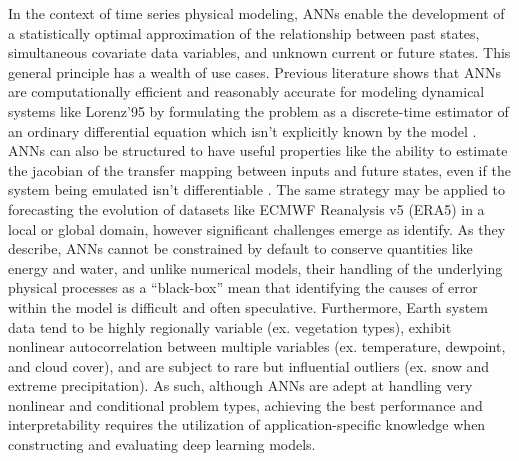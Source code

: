 In the context of time series physical modeling, ANNs enable the development of a statistically optimal approximation of the relationship between past states, simultaneous covariate data variables, and unknown current or future states. This general principle has a wealth of use cases. Previous literature shows that ANNs are computationally efficient and reasonably accurate for modeling dynamical systems like Lorenz'95 by formulating the problem as a discrete-time estimator of an ordinary differential equation which isn't explicitly known by the model \citep{fablet_bilinear_2018}. ANNs can also be structured to have useful properties like the ability to estimate the jacobian of the transfer mapping between inputs and future states, even if the system being emulated isn't differentiable \citep{nonnenmacher_deep_2021}. The same strategy may be applied to forecasting the evolution of datasets like ECMWF Reanalysis v5 (ERA5) in a local or global domain, however significant challenges emerge as \citep{dueben_challenges_2018} identify. As they describe, ANNs cannot be constrained by default to conserve quantities like energy and water, and unlike numerical models, their handling of the underlying physical processes as a ``black-box'' mean that identifying the causes of error within the model is difficult and often speculative. Furthermore, Earth system data tend to be highly regionally variable (ex. vegetation types), exhibit nonlinear autocorrelation between multiple variables (ex. temperature, dewpoint, and cloud cover), and are subject to rare but influential outliers (ex. snow and extreme precipitation). As such, although ANNs are adept at handling very nonlinear and conditional problem types, achieving the best performance and interpretability requires the utilization of application-specific knowledge when constructing and evaluating deep learning models.


